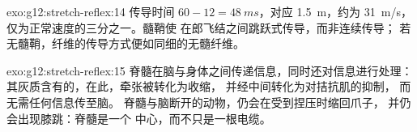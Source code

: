 \begin{solution}{exo:g12:stretch-reflex:14}
传导时间 $60 - 12 = \qty{48}{ms}$，对应 \qty{1.5}{m}，约为
\qty{31}{m/s}，仅为正常速度的三分之一。髓鞘使
在郎飞结之间跳跃式传导，而非连续传导；
若无髓鞘，纤维的传导方式便如同细的无髓纤维。
\end{solution}

\begin{solution}{exo:g12:stretch-reflex:15}
脊髓在脑与身体之间传递信息，同时还对信息进行处理：
其灰质含有的，在此，牵张被转化为收缩，
并经中间转化为对拮抗肌的抑制，
而无需任何信息传至脑。
脊髓与脑断开的动物，仍会在受到捏压时缩回爪子，
并仍会出现膝跳：脊髓是一个
中心，而不只是一根电缆。
\end{solution}

